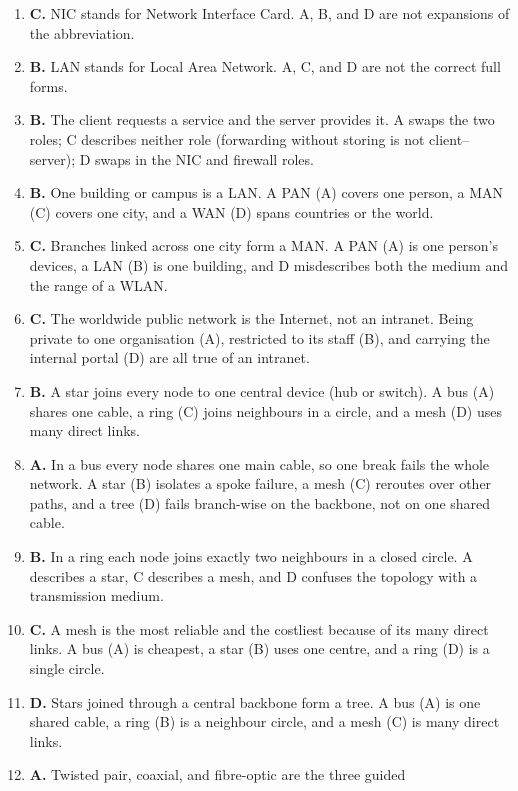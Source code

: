 \begin{enumerate}[label=\textbf{Q\arabic*.}, leftmargin=*]
\item \textbf{C.} NIC stands for Network Interface Card. A, B, and D are not
  expansions of the abbreviation.
\item \textbf{B.} LAN stands for Local Area Network. A, C, and D are not the
  correct full forms.
\item \textbf{B.} The client requests a service and the server provides it.
  A swaps the two roles; C describes neither role (forwarding without
  storing is not client--server); D swaps in the NIC and firewall roles.
\item \textbf{B.} One building or campus is a LAN. A PAN (A) covers one
  person, a MAN (C) covers one city, and a WAN (D) spans countries or the
  world.
\item \textbf{C.} Branches linked across one city form a MAN. A PAN (A) is
  one person's devices, a LAN (B) is one building, and D misdescribes both
  the medium and the range of a WLAN.
\item \textbf{C.} The worldwide public network is the Internet, not an
  intranet. Being private to one organisation (A), restricted to its staff
  (B), and carrying the internal portal (D) are all true of an intranet.
\item \textbf{B.} A star joins every node to one central device (hub or
  switch). A bus (A) shares one cable, a ring (C) joins neighbours in a
  circle, and a mesh (D) uses many direct links.
\item \textbf{A.} In a bus every node shares one main cable, so one break
  fails the whole network. A star (B) isolates a spoke failure, a mesh (C)
  reroutes over other paths, and a tree (D) fails branch-wise on the
  backbone, not on one shared cable.
\item \textbf{B.} In a ring each node joins exactly two neighbours in a
  closed circle. A describes a star, C describes a mesh, and D confuses the
  topology with a transmission medium.
\item \textbf{C.} A mesh is the most reliable and the costliest because of
  its many direct links. A bus (A) is cheapest, a star (B) uses one centre,
  and a ring (D) is a single circle.
\item \textbf{D.} Stars joined through a central backbone form a tree. A bus
  (A) is one shared cable, a ring (B) is a neighbour circle, and a mesh (C)
  is many direct links.
\item \textbf{A.} Twisted pair, coaxial, and fibre-optic are the three guided

\end{enumerate}
